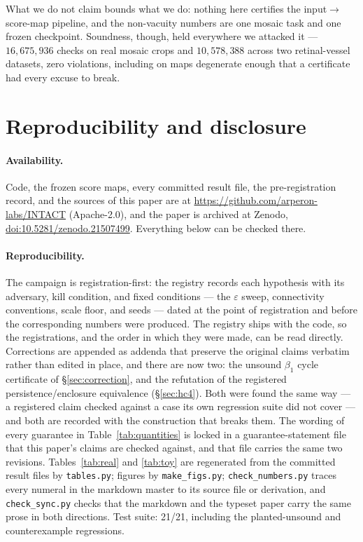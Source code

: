 \documentclass[10pt]{article}
\newcommand{\eps}{\varepsilon}
\begin{document}
What we do not claim bounds what we do: nothing here certifies the
input$\to$score-map pipeline, and the non-vacuity numbers are one mosaic
task and one frozen checkpoint. Soundness, though, held everywhere we
attacked it --- $16{,}675{,}936$ checks on real mosaic crops and
$10{,}578{,}388$ across two retinal-vessel datasets, zero violations,
including on maps degenerate enough that a certificate had every excuse to
break.

\section{Reproducibility and disclosure}\label{sec:repro}

\paragraph{Availability.} Code, the frozen score maps, every committed
result file, the pre-registration record, and the sources of this paper
are at \url{https://github.com/arperon-labs/INTACT} (Apache-2.0), and the
paper is archived at Zenodo, \href{https://doi.org/10.5281/zenodo.21507499}{doi:10.5281/zenodo.21507499}.
Everything below can be checked there.

\paragraph{Reproducibility.} The campaign is registration-first: the registry records each hypothesis with its
adversary, kill condition, and fixed conditions --- the $\eps$ sweep,
connectivity conventions, scale floor, and seeds --- dated at the point of
registration and before the corresponding numbers were produced. The
registry ships with the code, so the registrations, and the order in which
they were made, can be read directly. Corrections are appended as addenda
that preserve the original claims verbatim rather than edited in place, and there are now two: the unsound $\beta_1$ cycle
certificate of \S\ref{sec:correction}, and the refutation of the
registered persistence/enclosure equivalence (\S\ref{sec:hc4}). Both were
found the same way --- a registered claim checked against a case its own
regression suite did not cover --- and both are recorded with the
construction that breaks them. The wording of every guarantee in
Table~\ref{tab:quantities} is locked in a guarantee-statement file that
this paper's claims are checked against, and that file carries the same
two revisions. Tables~\ref{tab:real} and
\ref{tab:toy} are regenerated from the committed result files by
\texttt{tables.py}; figures by \texttt{make\_figs.py};
\texttt{check\_numbers.py} traces every numeral in the markdown master to
its source file or derivation, and \texttt{check\_sync.py} checks that the
markdown and the typeset paper carry the same prose in both directions. Test suite: 21/21, including the
planted-unsound and counterexample regressions.
\end{document}
